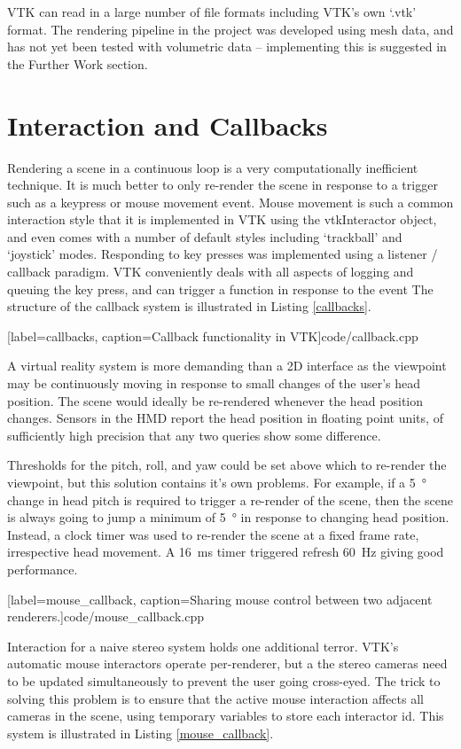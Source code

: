 \documentclass[MSc,paper=a4,pagesize=auto]{icldt}
\begin{document}
VTK can read in a large number of file formats including  VTK's own `.vtk' format. The rendering pipeline in the project was developed using mesh data, and has not yet been tested with volumetric data -- implementing this is suggested in the Further Work section.

\section{Interaction and Callbacks}
Rendering a scene in a continuous loop is a very computationally inefficient technique. It is much better to only re-render the scene in response to a trigger such as a keypress or mouse movement event. Mouse movement is such a common interaction style that it is implemented in VTK using the vtkInteractor object, and even comes with a number of default styles including `trackball' and `joystick' modes. Responding to key presses was implemented using a listener  / callback paradigm. VTK conveniently deals with all aspects of logging and queuing the key press, and can trigger a function in response to the event The structure of the callback system is illustrated in Listing \ref{callbacks}. 


  [label=callbacks, caption=Callback functionality in VTK]{code/callback.cpp}

A virtual reality system is more demanding than a 2D interface as the viewpoint may be continuously moving in response to small changes of the user's head position. The scene would ideally be re-rendered whenever the head position changes. Sensors in the HMD report the head position in floating point units, of sufficiently high precision that any two queries show some difference.

Thresholds for the pitch, roll, and yaw could be set above which to re-render the viewpoint, but this solution contains it's own problems. For example, if a \SI{5}{\degree} change in head pitch is required to trigger a re-render of the scene, then the scene is always going to jump a minimum of \SI{5}{\degree} in response to changing head position. Instead, a clock timer was used to re-render the scene at a fixed frame rate, irrespective head movement. A \SI{16}{\ms} timer triggered refresh \SI{60}{\Hz}  giving good performance. 


  [label=mouse_callback, caption=Sharing mouse control between two adjacent renderers.]{code/mouse_callback.cpp}
  
Interaction for a naive stereo system holds one additional terror. VTK's automatic mouse interactors operate per-renderer, but a the stereo cameras need to be updated simultaneously to prevent the user going cross-eyed. The trick to solving this problem is to ensure that the active mouse interaction affects all cameras in the scene, using temporary variables to store each interactor id. This system is illustrated in Listing \ref{mouse_callback}.
\end{document}
